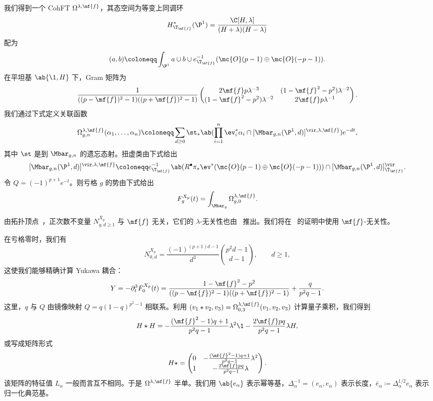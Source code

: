 我们得到一个 CohFT \(\Omega^{\lambda,\mf{f}}\)，其态空间为等变上同调环
\[ H^*_{\T_{\mf{f}}}(\P^1) = \frac{\C[H,\lambda]}{(H+\lambda)(H-\lambda)} \]
配为
\[ (a,b) \coloneqq \int_{\P^1} a \cup b \cup e^{-1}_{\T_{\mf{f}}}(\mc{O}(p-1)\oplus\mc{O}(-p-1)). \]
在平坦基 \(\ab\{\1,H\}\) 下，Gram 矩阵为
\[ \frac{1}{((p-\mf{f})^2-1)((p+\mf{f})^2-1)}\begin{pmatrix} 2\mf{f}p\lambda^{-3} & (1-\mf{f}^2-p^2)\lambda^{-2} \\ (1-\mf{f}^2-p^2)\lambda^{-2} & 2\mf{f}p\lambda^{-1} \end{pmatrix}. \]
我们通过下式定义关联函数
\[ \Omega^{\lambda,\mf{f}}_{g,n}(\alpha_1,\ldots,\alpha_n) \coloneqq \sum_{d\geq0}\st_*\ab(\prod_{i=1}^n \ev_i^*\alpha_i \cap [\Mbar_{g,n}(\P^1,d)]^{\vir,\lambda,\mf{f}})e^{-dt}, \]
其中 \(\st\) 是到 \(\Mbar_{g,n}\) 的遗忘态射。扭虚类由下式给出
\[ [\Mbar_{g,n}(\P^1,d)]^{\vir,\lambda,\mf{f}} \coloneqq e^{-1}_{\T_{\mf{f}}}\ab(R^{\bullet}\pi_*\ev^*(\mc{O}(p-1)\oplus\mc{O}(-p-1))) \cap [\Mbar_{g,n}(\P^1,d)]^{\vir}_{\T_{\mf{f}}}. \]
令 \(Q = (-1)^{p+1}e^{-t}\)。则亏格 \(g\) 的势由下式给出
\[ F^{X_p}_g(t) = \int_{\Mbar_g} \Omega^{\lambda,\mf{f}}_{g,0}. \]

\begin{rmk}
    由拓扑顶点~\cite{LLLZ2009}，正次数不变量 \(N^{X_p}_{g,d\geq1}\) 与 \(\mf{f}\) 无关，它们的 \(\lambda\)-无关性也由~ 推出。我们将在~ 的证明中使用 \(\mf{f}\)-无关性。
\end{rmk}

在亏格零时，我们有
\[ N^{X_p}_{0,d} = \frac{(-1)^{(p+1)d-1}}{d^3}\binom{p^2d-1}{d-1}, \qquad d \geq 1, \]
这使我们能够精确计算 Yukawa 耦合：
\[ Y = -\partial_t^3 F_0^{X_p}(t) = \frac{1-\mf{f}^2-p^2}{((p-\mf{f})^2-1)((p+\mf{f})^2-1)} + \frac{q}{p^2q-1}. \]
这里，\(q\) 与 \(Q\) 由镜像映射 \(Q = q(1-q)^{p^2-1}\) 相联系。利用 \((v_1 \star v_2, v_3) = \Omega^{\lambda,\mf{f}}_{0,3}(v_1,v_2,v_3)\) 计算量子乘积，我们得到
\[ H \star H = -\frac{(\mf{f}^2-1)q+1}{p^2q-1}\lambda^2 \1 - \frac{2\mf{f}pq}{p^2q-1}\lambda H, \]
或写成矩阵形式
\[ H \star = \begin{pmatrix} 0 & -\frac{(\mf{f}^2-1)q+1}{p^2q-1}\lambda^2 \\ 1 & -\frac{2\mf{f}pq}{p^2q-1}\lambda \end{pmatrix}. \]
该矩阵的特征值 \(L_{\alpha}\) 一般而言互不相同。于是 \(\Omega^{\lambda,\mf{f}}\) 半单。我们用 \(\ab\{e_{\alpha}\}\) 表示幂等基，\(\Delta_{\alpha}^{-1} = (e_{\alpha},e_{\alpha})\) 表示长度，\(\bar{e}_{\alpha} \coloneqq \Delta_{\alpha}^{1/2}e_{\alpha}\) 表示归一化典范基。

